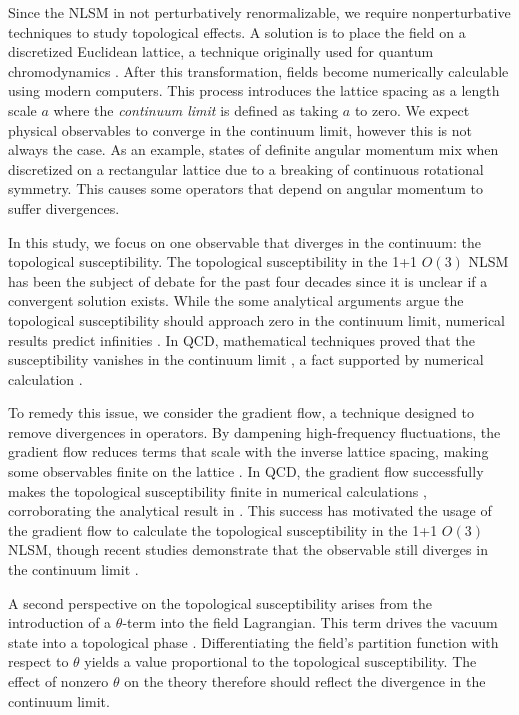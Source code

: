 Since the NLSM in not perturbatively renormalizable, we require nonperturbative techniques to study topological effects. A solution is to place the field on a discretized Euclidean lattice, a technique originally used for quantum chromodynamics \cite{wilson1974}. After this transformation, fields become numerically calculable using modern computers. This process introduces the lattice spacing as a length scale $a$ where the \textit{continuum limit} is defined as taking $a$ to zero. We expect physical observables to converge in the continuum limit, however this is not always the case. As an example, states of definite angular momentum mix when discretized on a rectangular lattice due to a breaking of continuous rotational symmetry. This causes some operators that depend on angular momentum to suffer divergences. 

In this study, we focus on one observable that diverges in the continuum: the topological susceptibility. The topological susceptibility in the 1+1 $O(3)$ NLSM has been the subject of debate for the past four decades \cite{bietenholz2018} since it is unclear if a convergent solution exists. While the some analytical arguments argue the topological susceptibility should approach zero in the continuum limit, numerical results predict infinities \cite{berg1981}. In QCD, mathematical techniques proved that the susceptibility vanishes in the continuum limit \cite{giusti2004}, a fact supported by numerical calculation \cite{bruno2014}.

To remedy this issue, we consider the gradient flow, a technique designed to remove divergences in operators. By dampening high-frequency fluctuations, the gradient flow reduces terms that scale with the inverse lattice spacing, making some observables finite on the lattice \cite{monahan2016}. In QCD, the gradient flow successfully makes the topological susceptibility finite in numerical calculations \cite{bruno2014}, corroborating the analytical result in \cite{giusti2004}. This success has motivated the usage of the gradient flow to calculate the topological susceptibility in the 1+1 $O(3)$ NLSM, though recent studies demonstrate that the observable still diverges in the continuum limit \cite{bietenholz2018}. 

A second perspective on the topological susceptibility arises from the introduction of a $\theta$-term into the field Lagrangian. This term drives the vacuum state into a topological phase \cite{allessalom2008}. Differentiating the field's partition function with respect to $\theta$ yields a value proportional to the topological susceptibility. The effect of nonzero $\theta$ on the theory therefore should reflect the divergence in the continuum limit.

